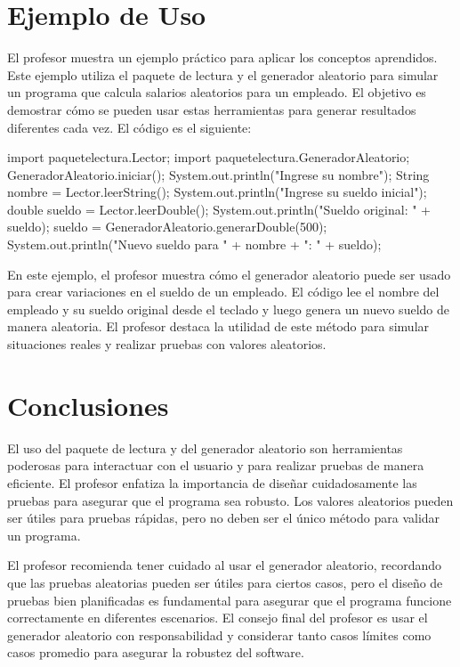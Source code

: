 \documentclass[a4paper]{report}
\begin{document}
\section{Ejemplo de Uso}

El profesor muestra un ejemplo práctico para aplicar los conceptos aprendidos. Este ejemplo utiliza el paquete de lectura y el generador aleatorio para simular un programa que calcula salarios aleatorios para un empleado. El objetivo es demostrar cómo se pueden usar estas herramientas para generar resultados diferentes cada vez. El código es el siguiente:

\begin{roundedlst}
import paquetelectura.Lector;
import paquetelectura.GeneradorAleatorio;
GeneradorAleatorio.iniciar();
System.out.println("Ingrese su nombre");
String nombre = Lector.leerString();
System.out.println("Ingrese su sueldo inicial");
double sueldo = Lector.leerDouble();
System.out.println("Sueldo original: " + sueldo);
sueldo = GeneradorAleatorio.generarDouble(500);
System.out.println("Nuevo sueldo para " + nombre 
                    + ": " + sueldo);
\end{roundedlst}

En este ejemplo, el profesor muestra cómo el generador aleatorio puede ser usado para crear variaciones en el sueldo de un empleado. El código lee el nombre del empleado y su sueldo original desde el teclado y luego genera un nuevo sueldo de manera aleatoria. El profesor destaca la utilidad de este método para simular situaciones reales y realizar pruebas con valores aleatorios.

\section{Conclusiones}

El uso del paquete de lectura y del generador aleatorio son herramientas poderosas para interactuar con el usuario y para realizar pruebas de manera eficiente. El profesor enfatiza la importancia de diseñar cuidadosamente las pruebas para asegurar que el programa sea robusto. Los valores aleatorios pueden ser útiles para pruebas rápidas, pero no deben ser el único método para validar un programa.

El profesor recomienda tener cuidado al usar el generador aleatorio, recordando que las pruebas aleatorias pueden ser útiles para ciertos casos, pero el diseño de pruebas bien planificadas es fundamental para asegurar que el programa funcione correctamente en diferentes escenarios. El consejo final del profesor es usar el generador aleatorio con responsabilidad y considerar tanto casos límites como casos promedio para asegurar la robustez del software.
\end{document}

